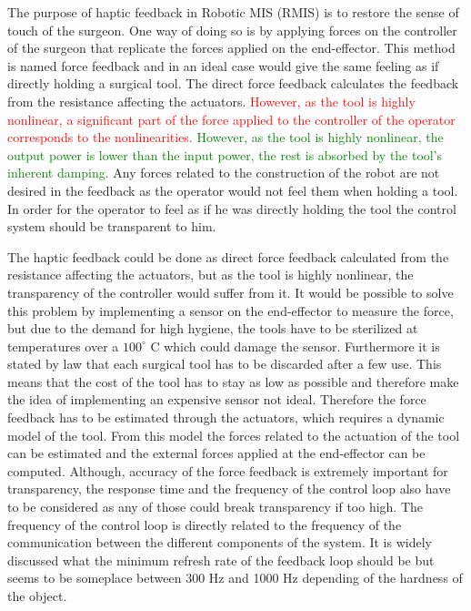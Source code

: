 The purpose of haptic feedback in Robotic MIS (RMIS) is to restore the sense of touch of the surgeon. One way of doing so is by applying forces on the controller of the surgeon that replicate the forces applied on the end-effector. This method is named force feedback and in an ideal case would give the same feeling as if directly holding a surgical tool. The direct force feedback calculates the feedback from the resistance affecting the actuators. \textcolor{red}{However, as the tool is highly nonlinear, a significant part of the force applied to the controller of the operator corresponds to the nonlinearities.}
\textcolor{green}{However, as the tool is highly nonlinear, the output power is lower than the input power, the rest is absorbed by the tool's inherent damping.}
 Any forces related to the construction of the robot are not desired in the feedback as the operator would not feel them when holding a tool. In order for the operator to feel as if he was directly holding the tool the control system should be transparent to him.



The haptic feedback could be done as direct force feedback calculated from the resistance affecting the actuators, but as the tool is highly nonlinear, the transparency of the controller would suffer from it. It would be possible to solve this problem by implementing a sensor on the end-effector to measure the force, but due to the demand for high hygiene, the tools have to be sterilized at temperatures over a $100^\circ$ C which could damage the sensor. Furthermore it is stated by law that each surgical tool has to be discarded after a few use. This means that the cost of the tool has to stay as low as possible and therefore make the idea of implementing an expensive sensor not ideal. Therefore the force feedback has to be estimated through the actuators, which requires a dynamic model of the tool. From this model the forces related to the actuation of the tool can be estimated and the external forces applied at the end-effector can be computed. Although, accuracy of the force feedback is extremely important for transparency, the response time and the frequency of the control loop also have to be considered as any of those could break transparency if too high. The frequency of the control loop is directly related to the frequency of the communication between the different components of the system. It is widely discussed what the minimum refresh rate of the feedback loop should be but seems to be someplace between 300 Hz and 1000 Hz depending of the hardness of the object\cite{coles2011role}.%

